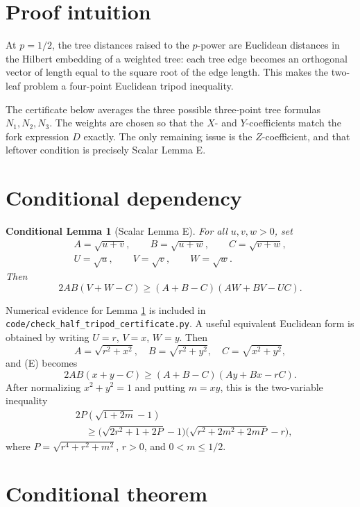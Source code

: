 \documentclass[11pt]{article}
\newtheorem{conditionallemma}{Conditional Lemma}
\begin{document}
\section{Proof intuition}

At \(p=1/2\), the tree distances raised to the \(p\)-power are Euclidean
distances in the Hilbert embedding of a weighted tree: each tree edge becomes
an orthogonal vector of length equal to the square root of the edge length.
This makes the two-leaf problem a four-point Euclidean tripod inequality.

The certificate below averages the three possible three-point tree formulas
\(N_1,N_2,N_3\).  The weights are chosen so that the \(X\)- and \(Y\)-coefficients
match the fork expression \(D\) exactly.  The only remaining issue is the
\(Z\)-coefficient, and that leftover condition is precisely Scalar Lemma E.

\section{Conditional dependency}

\begin{conditionallemma}[Scalar Lemma E]\label{lem:E}
For all \(u,v,w>0\), set
\[
\begin{gathered}
A=\sqrt{u+v},\qquad B=\sqrt{u+w},\qquad C=\sqrt{v+w},\\
U=\sqrt u,\qquad V=\sqrt v,\qquad W=\sqrt w.
\end{gathered}
\]
Then
\[
  2AB(V+W-C)\ge (A+B-C)(AW+BV-UC).
\tag{E}
\]
\end{conditionallemma}

\noindent Numerical evidence for Lemma \ref{lem:E} is included in
\texttt{code/check\_half\_tripod\_certificate.py}.  A useful equivalent
Euclidean form is obtained by writing \(U=r\), \(V=x\), \(W=y\).  Then
\[
A=\sqrt{r^2+x^2},\quad B=\sqrt{r^2+y^2},\quad C=\sqrt{x^2+y^2},
\]
and (E) becomes
\[
  2AB(x+y-C)\ge (A+B-C)(Ay+Bx-rC).
\tag{E'}
\]
After normalizing \(x^2+y^2=1\) and putting \(m=xy\), this is the two-variable
inequality
\[
\begin{aligned}
&2P(\sqrt{1+2m}-1)\\
&\quad \ge
\big(\sqrt{2r^2+1+2P}-1\big)
\big(\sqrt{r^2+2m^2+2mP}-r\big),
\end{aligned}
\]
where \(P=\sqrt{r^4+r^2+m^2}\), \(r>0\), and \(0<m\le1/2\).

\section{Conditional theorem}
\end{document}
